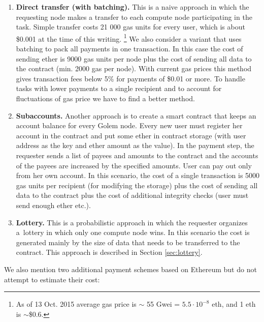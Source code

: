 \documentclass[a4paper]{article}
\begin{document}
    \begin{enumerate}
        \item \textbf{Direct transfer (with batching).}
        This is a naive approach in which the requesting node makes a transfer to each compute node participating
        in the task.
        Simple transfer costs 21 000 gas units for every user, which is about \$0.001 at the time of this writing.
        \footnote{As of 13 Oct. 2015 average gas price is $\sim$ 55 Gwei = $5.5 \cdot 10^{-8}$ eth, and 1 eth is
        $\sim$\$0.6.}
        We also consider a variant that uses batching\cite{BUTERIN} to pack all payments in one transaction.
        In this case the cost of sending ether is 9000 gas units per node plus the cost of sending all data
        to the contract (min. 2000 gas per node). With current gas prices this method gives transaction fees
        below 5\% for payments of \$0.01 or more. To handle tasks with lower payments to a single recipient and to
        account for fluctuations of gas price we have to find a better method.
	    \item \textbf{Subaccounts.}
        Another approach is to create a smart contract that keeps an account balance for every Golem node.
        Every new user must register her account in the contract and put some ether in contract storage (with user
        address as the key and ether amount as the value). In the payment step, the requester sends a list of payees
        and amounts to the contract and the accounts of the payees are increased by the specified amounts.
        User can pay out only from her own account. In this scenario, the cost of a single transaction is 5000 gas
        units per recipient (for modifying the storage) plus the cost of sending all data to the contract plus the
        cost of additional integrity checks (user must send enough ether etc.).
	    \item \textbf{Lottery.}
        This is a probabilistic approach in which the requester organizes a~lottery in which only one compute node
        wins. In this scenario the cost is generated mainly by the size of data that needs to be transferred to
        the contract. This approach is described in Section \ref{sec:lottery}.
    \end{enumerate}

    We also mention two additional payment schemes based on Ethereum but do not attempt to estimate their cost:
\end{document}
